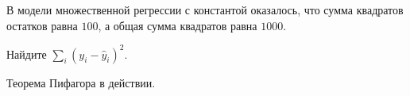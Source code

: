 
\begin{question}
В модели множественной регрессии с константой оказалось, что сумма квадратов остатков равна \(100\),
а общая сумма квадратов равна \(1000\).

Найдите \(\sum_i (y_i - \hat y_i)^2\).
\end{question}

\begin{solution}
Теорема Пифагора в действии.
\end{solution}

